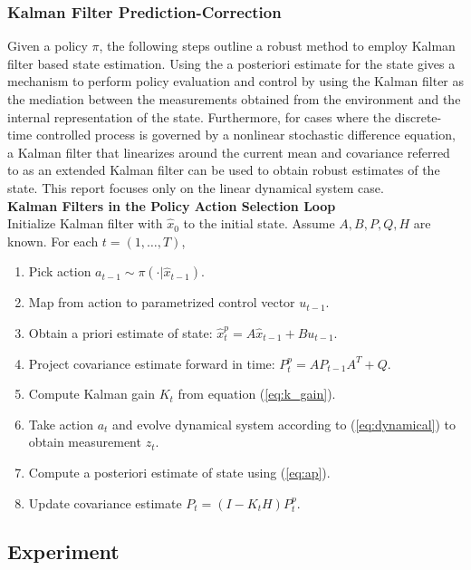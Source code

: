 \documentclass{article}
\begin{document}
\subsubsection{Kalman Filter Prediction-Correction}
Given a policy $\pi$, the following steps outline a robust method to employ Kalman filter based state estimation. Using the a posteriori estimate for the state gives a mechanism to perform policy evaluation and control by using the Kalman filter as the mediation between the measurements obtained from the environment and the internal representation of the state. Furthermore, for cases where the discrete-time controlled process is governed by a nonlinear stochastic difference equation, a Kalman filter that linearizes around the current mean and covariance referred to as an extended Kalman filter can be used to obtain robust estimates of the state. \cite{welch1995introduction} This report focuses only on the linear dynamical system case. \\

\noindent
\textbf{Kalman Filters in the Policy Action Selection Loop} \\

\noindent
Initialize Kalman filter with $\hat{x}_0$ to the initial state. Assume $A, B, P, Q, H$ are known. For each $t = (1, \ldots, T)$, 
\begin{enumerate}
	\item Pick action $a_{t-1} \sim \pi(\cdot | \hat{x}_{t-1})$. 
	\item Map from action to parametrized control vector $u_{t-1}$.
	\item Obtain a priori estimate of state: $\hat{x}_t^p = A\hat{x}_{t-1} + Bu_{t-1}$.
	\item Project covariance estimate forward in time: $P_{t}^p = AP_{t-1}A^T + Q$.
	\item Compute Kalman gain $K_t$ from equation (\ref{eq:k_gain}).
	\item Take action $a_t$ and evolve dynamical system according to (\ref{eq:dynamical}) to obtain measurement $z_t$.
	\item Compute a posteriori estimate of state using (\ref{eq:ap}).
	\item Update covariance estimate $P_t = (I - K_tH)P_t^p$.
\end{enumerate}

\subsection{Experiment}
\end{document}
